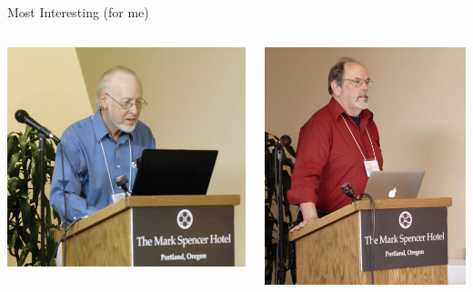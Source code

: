 \documentclass[17pt,dvipdfmx]{beamer}
\begin{document}
\begin{frame}[t]{Most Interesting (for me)}
\begin{itemize}
\begin{columns}[t]
\begin{column}{.4\textwidth}
\begin{columns}[t]
\begin{column}{.7\textwidth}
            \hspace*{10pt}\includegraphics[width=\textwidth]{william.jpg}
            \vfill
          \end{column}
          \begin{column}{.7\textwidth}
            \par\vspace*{40pt}\hspace*{-40pt}
            \includegraphics[width=.9\textwidth]{ward.jpg}

\end{column}
\end{columns}
\end{column}
\end{columns}
\end{itemize}
\end{frame}
\end{document}
